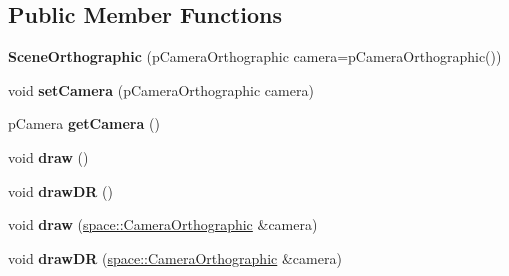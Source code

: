 \subsection*{Public Member Functions}
\begin{DoxyCompactItemize}
\item 
\hypertarget{classfillwave_1_1models_1_1SceneOrthographic_a6485974fe37e3a76f39be5a3805dbb23}{}{\bfseries Scene\+Orthographic} (p\+Camera\+Orthographic camera=p\+Camera\+Orthographic())\label{classfillwave_1_1models_1_1SceneOrthographic_a6485974fe37e3a76f39be5a3805dbb23}

\item 
\hypertarget{classfillwave_1_1models_1_1SceneOrthographic_af8ad498d5b14fc70a98ac662397fde03}{}void {\bfseries set\+Camera} (p\+Camera\+Orthographic camera)\label{classfillwave_1_1models_1_1SceneOrthographic_af8ad498d5b14fc70a98ac662397fde03}

\item 
\hypertarget{classfillwave_1_1models_1_1SceneOrthographic_aa825b75b75ffd382557fc728a9d7f4f8}{}p\+Camera {\bfseries get\+Camera} ()\label{classfillwave_1_1models_1_1SceneOrthographic_aa825b75b75ffd382557fc728a9d7f4f8}

\item 
\hypertarget{classfillwave_1_1models_1_1SceneOrthographic_ae1454e8e8681c797d0173eb5b2775a28}{}void {\bfseries draw} ()\label{classfillwave_1_1models_1_1SceneOrthographic_ae1454e8e8681c797d0173eb5b2775a28}

\item 
\hypertarget{classfillwave_1_1models_1_1SceneOrthographic_a47f56c595b4e79bce06b787acae54636}{}void {\bfseries draw\+D\+R} ()\label{classfillwave_1_1models_1_1SceneOrthographic_a47f56c595b4e79bce06b787acae54636}

\item 
\hypertarget{classfillwave_1_1models_1_1SceneOrthographic_ab51c692501ef0a63c03c8c473a885746}{}void {\bfseries draw} (\hyperlink{classfillwave_1_1space_1_1CameraOrthographic}{space\+::\+Camera\+Orthographic} \&camera)\label{classfillwave_1_1models_1_1SceneOrthographic_ab51c692501ef0a63c03c8c473a885746}

\item 
\hypertarget{classfillwave_1_1models_1_1SceneOrthographic_a2e305321fe27d97184280b6ccc726ea8}{}void {\bfseries draw\+D\+R} (\hyperlink{classfillwave_1_1space_1_1CameraOrthographic}{space\+::\+Camera\+Orthographic} \&camera)\label{classfillwave_1_1models_1_1SceneOrthographic_a2e305321fe27d97184280b6ccc726ea8}


\end{DoxyCompactItemize}
